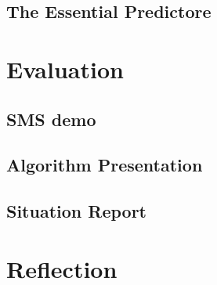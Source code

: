\subsection{The Essential Predictore}
\section{Evaluation}
\subsection{SMS demo}
\subsection{Algorithm Presentation}
\subsection{Situation Report}
\section{Reflection}


